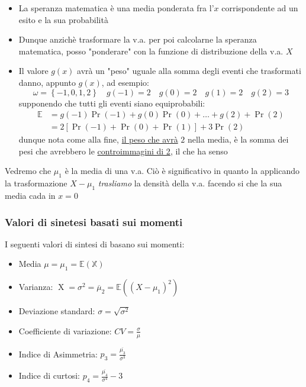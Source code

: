 \begin{itemize}
	\item La speranza matematica è una media ponderata fra l'$ x $ corrispondente ad un esito e la sua probabilità
	\item Dunque anzichè trasformare la v.a. per poi calcolarne la speranza matematica, posso "ponderare" con la funzione di distribuzione della v.a. $ X $
	\item Il valore $ g\left(x\right) $ avrà un "peso" uguale alla somma degli eventi che trasformati danno, appunto $ g\left(x\right) $, ad esempio:
	      \[
		      \omega = \left\{-1, 0 , 1, 2\right\} \quad g\left(-1\right) = 2 \quad g\left(0\right) = 2 \quad g\left(1\right) = 2 \quad  g\left(2\right) = 3
	      \]
	      supponendo che tutti gli eventi siano equiprobabili:
	      \begin{align*}
		      \mathbb{E} & = g\left(-1\right) \Pr \left(-1\right) + g\left(0\right) \Pr \left(0\right)+ \ldots + g\left(2\right) + \Pr\left(2\right) \\
		                 & = 2 \left[\Pr \left(-1\right) + \Pr \left(0\right) + \Pr \left(1\right)\right] + 3 \Pr \left(2\right)
	      \end{align*}
	      dunque nota come alla fine, \underline{il peso che avrà} $ 2 $ nella media, è la somma dei pesi che avrebbero le \underline{controimmagini di 2}, il che ha senso
\end{itemize}
Vedremo che $ \mu_1 $ è la media di una v.a. Ciò è significativo in quanto la applicando la trasformazione $ X - \mu_1 $ \textit{trasliamo} la densità della v.a. facendo si che la sua media cada in $ x=0 $
\subsubsection*{Valori di sinetesi basati sui momenti}
I seguenti valori di sintesi di basano sui momenti:
\begin{itemize}
	\item  Media $ \mu  = \mu  _1 = \mathbb{E \left(X\right)} $
	\item Varianza: $ \operatorname{X} = \sigma ^2 = \overline{\mu}_2 = \mathbb{E}\left(\left(X - \mu_1\right)^2 \right) $
	\item Deviazione standard: $ \sigma = \sqrt{\sigma ^2 }$
	\item Coefficiente di variazione: $ CV = \frac{\sigma}{\mu } $
	\item Indice di Asimmetria: $ p_3 = \displaystyle\frac{\overline{\mu_3}}{\sigma ^{3}} $
	\item Indice di curtosi: $  p_4 = \displaystyle\frac{\overline{\mu_4}}{\sigma ^{4}}-3 $
\end{itemize}
